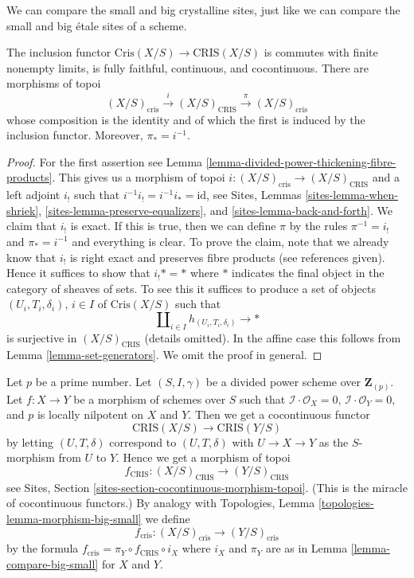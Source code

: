 \noindent
We can compare the small and big crystalline sites, just like
we can compare the small and big \'etale sites of a scheme.

\begin{lemma}
\label{lemma-compare-big-small}
The inclusion functor $\text{Cris}(X/S) \to \text{CRIS}(X/S)$ is
commutes with finite nonempty limits, is fully faithful, continuous,
and cocontinuous. There are morphisms of topoi
$$
(X/S)_{\text{cris}} \xrightarrow{i} (X/S)_{\text{CRIS}}
\xrightarrow{\pi} (X/S)_{\text{cris}}
$$
whose composition is the identity and of which the first is induced
by the inclusion functor. Moreover, $\pi_* = i^{-1}$.
\end{lemma}

\begin{proof}
For the first assertion see
Lemma \ref{lemma-divided-power-thickening-fibre-products}.
This gives us a morphism of topoi
$i : (X/S)_{\text{cris}} \to (X/S)_{\text{CRIS}}$ and a left adjoint
$i_!$ such that $i^{-1}i_! = i^{-1}i_* = \text{id}$, see
Sites, Lemmas \ref{sites-lemma-when-shriek},
\ref{sites-lemma-preserve-equalizers}, and
\ref{sites-lemma-back-and-forth}.
We claim that $i_!$ is exact. If this is true, then we can define
$\pi$ by the rules $\pi^{-1} = i_!$ and $\pi_* = i^{-1}$
and everything is clear. To prove the claim, note that we already know
that $i_!$ is right exact and preserves fibre products (see references
given). Hence it suffices to show that $i_! * = *$ where $*$ indicates
the final object in the category of sheaves of sets. 
To see this it suffices to produce a set of objects
$(U_i, T_i, \delta_i)$, $i \in I$ of $\text{Cris}(X/S)$ such that
$$
\coprod\nolimits_{i \in I} h_{(U_i, T_i, \delta_i)} \to *
$$
is surjective in $(X/S)_{\text{CRIS}}$ (details omitted).
In the affine case this
follows from Lemma \ref{lemma-set-generators}. We omit the proof
in general.
\end{proof}

\begin{remark}[Functoriality]
\label{remark-functoriality-cris}
Let $p$ be a prime number.
Let $(S, I, \gamma)$ be a divided power scheme
over $\mathbf{Z}_{(p)}$.
Let $f : X \to Y$ be a morphism of schemes over $S$ such that
$\mathcal{I} \cdot \mathcal{O}_X = 0$,
$\mathcal{I} \cdot \mathcal{O}_Y = 0$, and $p$ is locally nilpotent
on $X$ and $Y$. Then we get a cocontinuous functor
$$
\text{CRIS}(X/S) \longrightarrow \text{CRIS}(Y/S)
$$
by letting $(U, T, \delta)$ correspond to $(U, T, \delta)$
with $U \to X \to Y$ as the $S$-morphism from $U$ to $Y$.
Hence we get a morphism of topoi
$$
f_{\text{CRIS}} : (X/S)_{\text{CRIS}} \longrightarrow (Y/S)_{\text{CRIS}}
$$
see Sites, Section \ref{sites-section-cocontinuous-morphism-topoi}.
(This is the miracle of cocontinuous functors.) By analogy with
Topologies, Lemma \ref{topologies-lemma-morphism-big-small} we define
$$
f_{\text{cris}} : (X/S)_{\text{cris}} \longrightarrow (Y/S)_{\text{cris}}
$$
by the formula $f_{\text{cris}} = \pi_Y \circ f_{\text{CRIS}} \circ i_X$
where $i_X$ and $\pi_Y$ are as in Lemma \ref{lemma-compare-big-small}
for $X$ and $Y$.
\end{remark}

